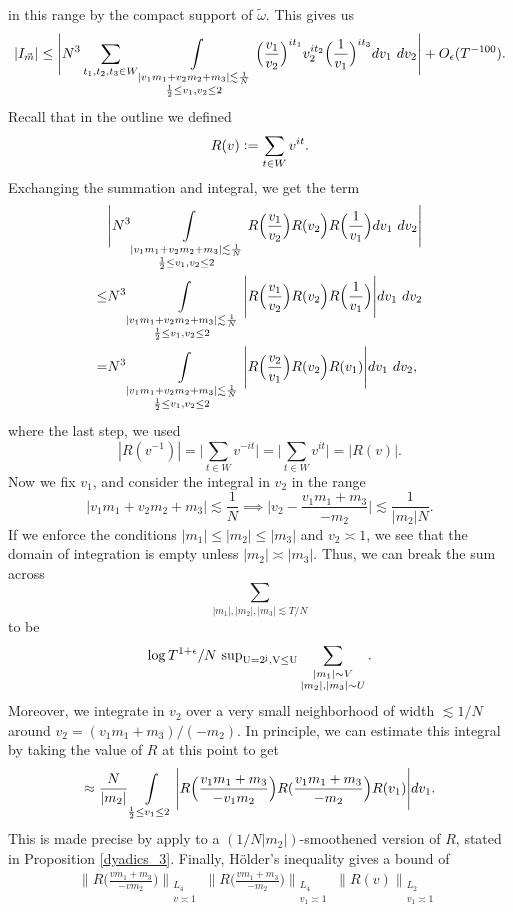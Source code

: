 in this range by the compact support of $\tilde{\omega}$. This gives us \begin{equation}
    |I_{\vec{m}}|\leq \Bigg|N^3 \sum_{t_1,t_2,t_3\in W}\int\displaylimits_{\substack{
        |v_1m_1+v_2m_2+m_3|\lesssim \frac{1}{N}\\
        \frac{1}{2}\leq v_1,v_2\leq 2
    }} \Big(\frac{v_1}{v_2}\Big)^{it_1} v_2^{it_2}\Big(\frac{1}{v_1}\Big)^{it_3}  dv_1\ dv_2 \Bigg|+O_{\epsilon}(T^{-100}).
\end{equation}
Recall that in the outline we defined\[
R(v)\mathrel{\mathop:}=\sum_{t\in W} v^{it}.
\]
Exchanging the summation and integral, we get the term \begin{align*}
    &\Bigg| N^3 \int\displaylimits_{\substack{
        |v_1m_1+v_2m_2+m_3|\lesssim \frac{1}{N}\\
        \frac{1}{2}\leq v_1,v_2\leq 2
    }} R\Big(\frac{v_1}{v_2}\Big) R({v_2}\Big) R\Big(\frac{1}{v_1}\Big) dv_1\ dv_2 \Bigg|\\
    \leq & N^3 \int\displaylimits_{\substack{
        |v_1m_1+v_2m_2+m_3|\lesssim \frac{1}{N}\\
        \frac{1}{2}\leq v_1,v_2\leq 2
    }} \Bigg|R\Big(\frac{v_1}{v_2}\Big) R({v_2}\Big) R\Big(\frac{1}{v_1}\Big)\Bigg| dv_1\ dv_2 \\
    =  & N^3 \int\displaylimits_{\substack{
        |v_1m_1+v_2m_2+m_3|\lesssim \frac{1}{N}\\
        \frac{1}{2}\leq v_1,v_2\leq 2
    }} \Bigg|R\Big(\frac{v_2}{v_1}\Big) R({v_2}\Big) R({v_1})\Bigg| dv_1\ dv_2,
\end{align*}
where the last step, we used \[
|R(v^{-1})| = \Big|\sum_{t\in W} v^{-it}\Big| = \Big|\sum_{t\in W} v^{it}\Big| = |R(v)|.
\]
Now we fix $v_1$, and consider the integral in $v_2$ in the range \[
    |v_1m_1+v_2m_2+m_3|\lesssim \frac{1}{N} \implies \Big|v_2 -\frac{v_1m_1+m_3}{-m_2}\Big|\lesssim \frac{1}{|m_2| N}.
\]
If we enforce the conditions $|m_1|\leq |m_2|\leq|m_3|$ and $v_2\asymp 1$, we see that the domain of integration is empty unless $|m_2|\asymp |m_3|$. Thus, we can break the sum across \[\sum_{|m_1|,|m_2|,|m_3|\lesssim T/N}\] to be \[\log T^{1+\epsilon}/N \ \rm{sup}_{U=2^j, V\leq U} \sum_{\substack{|m_1|\sim V\\  |m_2|, |m_3|\sim U}}.\]
Moreover, we integrate in $v_2$ over a very small neighborhood of width $\lesssim 1/N$ around $v_2=({v_1m_1+m_3})/({-m_2})$. In principle, we can estimate this integral by taking the value of $R$ at this point to get \[
    \approx  \frac{N}{|m_2|} \int\displaylimits_{\substack{
        \frac{1}{2}\leq v_1\leq 2
    }} \Bigg|R\Big(\frac{v_1m_1+m_3}{-v_1m_2}\Big) R(\frac{v_1m_1+m_3}{-m_2}\Big) R({v_1})\Bigg| dv_1.
\]
This is made precise by apply to a $(1/N|m_2|)$-smoothened version of $R$, stated in Proposition \ref{dyadics_3}. Finally, H\"older's inequality gives a bound of \begin{align*}
    \Big\|R\Big(\frac{vm_1+m_3}{-vm_2}\Big) \Big\|_{\substack{L_4\\ v\asymp 1}}\Big\|R\Big(\frac{vm_1+m_3}{-m_2}\Big) \Big\|_{\substack{L_4\\ v_1\asymp 1}}\Big\|R(v) \Big\|_{\substack{L_2\\ v_1\asymp 1}}
\end{align*}

